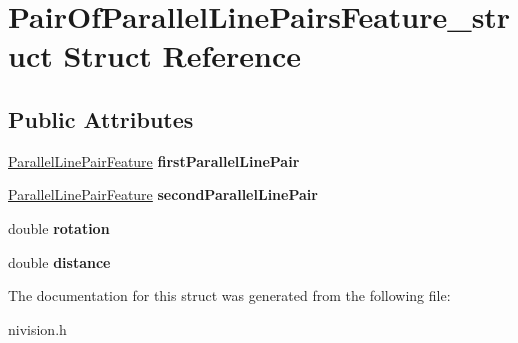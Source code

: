 \hypertarget{structPairOfParallelLinePairsFeature__struct}{\section{\-Pair\-Of\-Parallel\-Line\-Pairs\-Feature\-\_\-struct \-Struct \-Reference}
\label{structPairOfParallelLinePairsFeature__struct}
}
\subsection*{\-Public \-Attributes}
\begin{DoxyCompactItemize}
\item 
\hypertarget{structPairOfParallelLinePairsFeature__struct_a8de3489de85240bc9edca9d2de602377}{\hyperlink{structParallelLinePairFeature__struct}{\-Parallel\-Line\-Pair\-Feature} {\bfseries first\-Parallel\-Line\-Pair}}\label{structPairOfParallelLinePairsFeature__struct_a8de3489de85240bc9edca9d2de602377}

\item 
\hypertarget{structPairOfParallelLinePairsFeature__struct_a06bf51a3852e8c43c967d9328268cb9f}{\hyperlink{structParallelLinePairFeature__struct}{\-Parallel\-Line\-Pair\-Feature} {\bfseries second\-Parallel\-Line\-Pair}}\label{structPairOfParallelLinePairsFeature__struct_a06bf51a3852e8c43c967d9328268cb9f}

\item 
\hypertarget{structPairOfParallelLinePairsFeature__struct_a15b59451100dacb13718ef12cae6fa03}{double {\bfseries rotation}}\label{structPairOfParallelLinePairsFeature__struct_a15b59451100dacb13718ef12cae6fa03}

\item 
\hypertarget{structPairOfParallelLinePairsFeature__struct_ab134c15286b4682a9a4fea6299466371}{double {\bfseries distance}}\label{structPairOfParallelLinePairsFeature__struct_ab134c15286b4682a9a4fea6299466371}

\end{DoxyCompactItemize}


\-The documentation for this struct was generated from the following file\-:\begin{DoxyCompactItemize}
\item 
nivision.\-h\end{DoxyCompactItemize}
